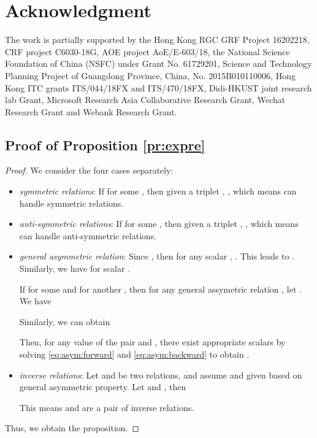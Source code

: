 \documentclass[conference]{IEEEtran}
\begin{document}
\section*{Acknowledgment}

The work is partially supported by 
the Hong Kong RGC GRF Project  16202218, 
CRF project  C6030-18G,  
AOE project AoE/E-603/18,  
the National Science Foundation of China (NSFC) under Grant No. 61729201, 
Science and Technology Planning Project of Guangdong Province, China, No. 2015B010110006,  
Hong Kong ITC grants  ITS/044/18FX  and  ITS/470/18FX,  
Didi-HKUST joint research lab Grant, 
Microsoft Research Asia Collaborative Research Grant, 
Wechat Research Grant and Webank Research Grant.






\appendix

\subsection{Proof of Proposition \ref{pr:expre}}
\label{app:proof:expre}
\begin{proof}
	We consider the four cases separately:
	\begin{itemize}[leftmargin=10px]
		\item \textit{symmetric relations}: 
		If  for some ,
		then given a triplet ,
		,
		which means  can handle symmetric relations.
		
		\item \textit{anti-symmetric relations}:
		If  for some ,
		then given a triplet ,
		,
		which means  can handle anti-symmetric relations.
		
		
		\item \textit{general asymmetric relation}:
		Since , 
		then for any scalar , 
		.
		This leads to .
		Similarly, we have  for scalar .
		
		If  for some  and  for another , then for any general assymetric relation , let . We have
		
		Similarly, we can obtain
		
		Then, for any value of the pair  
		and , 
		there exist appropriate scalars  by solving \eqref{eq:asym:forward} and \eqref{eq:asym:backward} 
		to obtain .
		
		\item \textit{inverse relations}:
		Let  and  be two relations, 
		and assume  
		and 
		given  based on general asymmetric property.
		Let  and , then
		
		This means  and  are a pair of inverse relations.
	\end{itemize}
	Thus,
	we obtain the proposition.
\end{proof}
\end{document}
